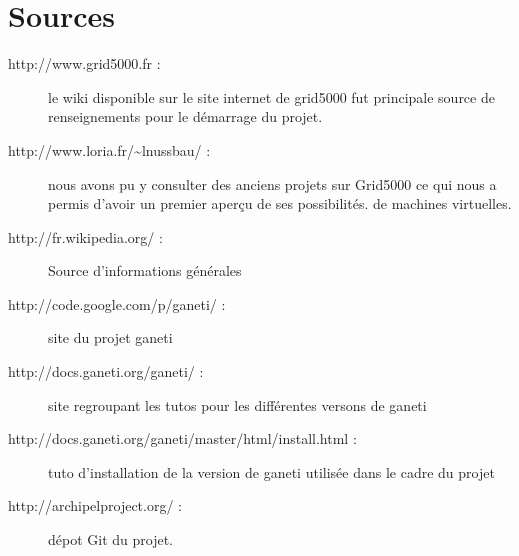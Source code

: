 \chapter{Sources}
\begin{description}
\item[http://www.grid5000.fr : ]le wiki disponible sur le site internet de grid5000 fut principale source de renseignements pour le démarrage du projet.
\item[http://www.loria.fr/\sim lnussbau/ : ]nous avons pu y consulter des anciens projets sur Grid5000 ce qui nous a permis d'avoir un premier aperçu de ses possibilités.
de machines virtuelles.
\item[http://fr.wikipedia.org/ :] Source d'informations générales
\item[http://code.google.com/p/ganeti/ :] site du projet ganeti
\item[http://docs.ganeti.org/ganeti/ :] site regroupant les tutos pour les différentes versons de ganeti
\item[http://docs.ganeti.org/ganeti/master/html/install.html :] tuto d'installation de la version de ganeti utilisée dans le cadre du projet 
\item[http://archipelproject.org/ :] dépot Git du projet.
\end{description}
